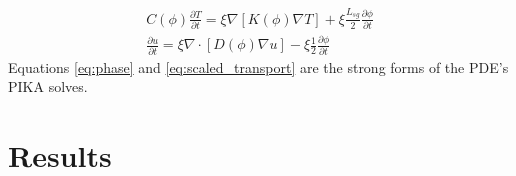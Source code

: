 \documentclass[twoside]{article}
\begin{document}
\begin{multicols}{2}
\begin{subequations} \label{eq:scaled_transport}
\begin{align}
	C(\phi)\frac{\partial T}{\partial t} = \xi\nabla [K(\phi) \nabla T] + \xi\frac{L_{sg}}{2}\frac{\partial \phi}{\partial t}\\
	\frac{\partial u}{\partial t} = \xi\nabla \cdot [D(\phi) \nabla u] - \xi \frac{ 1}{2}\frac{\partial \phi}{\partial t}
\end{align}
\end{subequations}
Equations \eqref{eq:phase} and \eqref{eq:scaled_transport} are the strong forms of the PDE's PIKA solves.

\section{Results}


\end{multicols}
\end{document}
